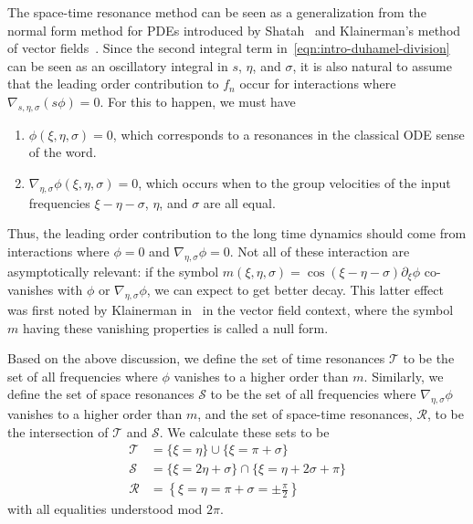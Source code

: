 \documentclass[letterpaper, reqno,final]{amsart}
\begin{document}
The space-time resonance method can be seen as a generalization from the normal form method for PDEs introduced by Shatah~\cite{shatahNormalFormsQuadratic1985} and Klainerman's method of vector fields~\cite{klainermanUniformDecayEstimates1985}.  Since the second integral term in~\eqref{eqn:intro-duhamel-division} can be seen as an oscillatory integral in $s$, $\eta$, and $\sigma$, it is also natural to assume that the leading order contribution to $f_n$ occur for interactions where $\nabla_{s,\eta,\sigma}(s\phi) = 0$.  For this to happen, we must have
\begin{enumerate}
    \item $\phi(\xi,\eta,\sigma) = 0$, which corresponds to a resonances in the classical ODE sense of the word.
    \item $\nabla_{\eta,\sigma}\phi(\xi,\eta,\sigma) = 0$, which occurs when to the group velocities of the input frequencies $\xi - \eta - \sigma$, $\eta$, and $\sigma$ are all equal.
\end{enumerate}
Thus, the leading order contribution to the long time dynamics should come from interactions where $\phi = 0$ and $\nabla_{\eta,\sigma} \phi = 0$.  Not all of these interaction are asymptotically relevant: if the symbol $m(\xi,\eta,\sigma) = \cos(\xi - \eta - \sigma) \partial_\xi \phi$ co-vanishes with $\phi$ or $\nabla_{\eta,\sigma} \phi$, we can expect to get better decay.  This latter effect was first noted by Klainerman in~\cite{klainermanNullConditionGlobal1986} in the vector field context, where the symbol $m$ having these vanishing properties is called a null form.

Based on the above discussion, we define the set of time resonances $\mathcal{T}$ to be the set of all frequencies where $\phi$ vanishes to a higher order than $m$.  Similarly, we define the set of space resonances $\mathcal{S}$ to be the set of all frequencies where $\nabla_{\eta,\sigma} \phi$ vanishes to a higher order than $m$, and the set of space-time resonances, $\mathcal{R}$, to be the intersection of $\mathcal{T}$ and $\mathcal{S}$.  We calculate these sets to be
\begin{equation}\label{eqn:space-time-resonance-sets}\begin{split}
    \mathcal{T} &= \{\xi = \eta\} \cup \{\xi = \pi + \sigma\}\\
    \mathcal{S} &= \{\xi = 2\eta + \sigma\} \cap\{ \xi = \eta + 2\sigma + \pi\}\\
    \mathcal{R} &= \left\{\xi = \eta = \pi + \sigma = \pm \frac{\pi}{2}\right\}
\end{split}\end{equation}
with all equalities understood mod $2\pi$.  
\end{document}
